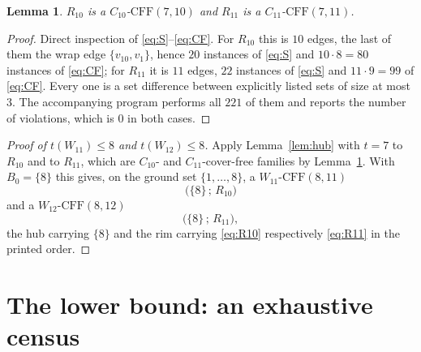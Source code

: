 \documentclass[11pt]{amsart}
\newtheorem{lemma}[theorem]{Lemma}
\newcommand{\CFF}{\mathrm{CFF}}
\begin{document}
\begin{lemma}\label{lem:witness}
$R_{10}$ is a $C_{10}$-$\CFF(7,10)$ and $R_{11}$ is a $C_{11}$-$\CFF(7,11)$.
\end{lemma}

\begin{proof}
Direct inspection of \eqref{eq:S}--\eqref{eq:CF}. For $R_{10}$ this is $10$
edges, the last of them the wrap edge $\{v_{10},v_1\}$, hence $20$ instances of
\eqref{eq:S} and $10\cdot 8=80$ instances of \eqref{eq:CF}; for $R_{11}$ it is
$11$ edges, $22$ instances of \eqref{eq:S} and $11\cdot 9=99$ of
\eqref{eq:CF}. Every one is a set difference between explicitly listed sets of
size at most $3$. The accompanying program performs all $221$ of them and
reports the number of violations, which is $0$ in both cases.
\end{proof}

\begin{proof}[Proof of $t(W_{11})\le 8$ and $t(W_{12})\le 8$]
Apply Lemma~\ref{lem:hub} with $t=7$ to $R_{10}$ and to $R_{11}$, which are
$C_{10}$- and $C_{11}$-cover-free families by Lemma~\ref{lem:witness}. With
$B_0=\{8\}$ this gives, on the ground set $\{1,\dots,8\}$, a
$W_{11}$-$\CFF(8,11)$
\[
 \bigl(\{8\}\,;\,R_{10}\bigr)
\]
and a $W_{12}$-$\CFF(8,12)$
\[
 \bigl(\{8\}\,;\,R_{11}\bigr),
\]
the hub carrying $\{8\}$ and the rim carrying \eqref{eq:R10} respectively
\eqref{eq:R11} in the printed order.
\end{proof}

\section{The lower bound: an exhaustive census}\label{sec:lower}
\end{document}
